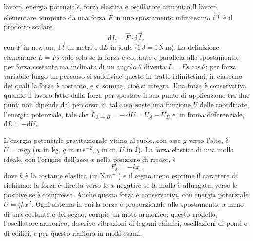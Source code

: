 \documentclass[11pt,a4paper]{article}
\newcommand{\dd}{\mathrm{d}}
\newcommand{\un}[1]{\,\mathrm{#1}}
\begin{document}
\begin{richiamo}{lavoro, energia potenziale, forza elastica e oscillatore armonico}
Il lavoro elementare compiuto da una forza $\vec F$ in uno spostamento infinitesimo $\dd\vec l$ è il prodotto scalare
\[
\dd L=\vec F\cdot\dd\vec l ,
\]
con $\vec F$ in newton, $\dd\vec l$ in metri e $\dd L$ in joule ($1\un{J}=1\un{N\,m}$). La definizione elementare $L=Fs$ vale solo se la forza è costante e parallela allo spostamento; per forza costante ma inclinata di un angolo $\theta$ diventa $L=Fs\cos\theta$; per forza variabile lungo un percorso si suddivide questo in tratti infinitesimi, in ciascuno dei quali la forza è costante, e si somma, cioè si integra. Una forza è conservativa quando il lavoro fatto dalla forza per spostare il suo punto di applicazione tra due punti non dipende dal percorso; in tal caso esiste una funzione $U$ delle coordinate, l'energia potenziale, tale che $L_{A\to B}=-\Delta U=U_A-U_B$ e, in forma differenziale, $\dd L=-\dd U$.

L'energia potenziale gravitazionale vicino al suolo, con asse $y$ verso l'alto, è $U=mgy$ ($m$ in kg, $g$ in $\mathrm{m\,s^{-2}}$, $y$ in m, $U$ in J). La forza elastica di una molla ideale, con l'origine dell'asse $x$ nella posizione di riposo, è
\[
F_x=-kx ,
\]
dove $k$ è la costante elastica (in $\mathrm{N\,m^{-1}}$) e il segno meno esprime il carattere di richiamo: la forza è diretta verso le $x$ negative se la molla è allungata, verso le positive se è compressa. Anche questa forza è conservativa, con energia potenziale $U=\tfrac12kx^2$. Ogni sistema in cui la forza è proporzionale allo spostamento, a meno di una costante e del segno, compie un moto armonico; questo modello, l'oscillatore armonico, descrive vibrazioni di legami chimici, oscillazioni di ponti e di edifici, e per questo riaffiora in molti esami.
\end{richiamo}
\end{document}
